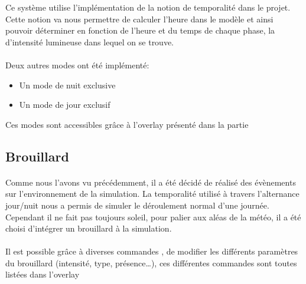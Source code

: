Ce système utilise l'implémentation de la notion de temporalité dans le projet.
Cette notion va nous permettre de calculer l'heure dans le modèle et ainsi
pouvoir déterminer en fonction de l'heure et du temps de chaque phase, la
d'intensité lumineuse dans lequel on se trouve.

\paragraph{}


\paragraph{}

Deux autres modes ont été implémenté:\\
\begin{itemize}
  \item Un mode de nuit exclusive
  \item Un mode de jour exclusif\\
\end{itemize}

Ces modes sont accessibles grâce à l'overlay présenté dans la partie %

\subsection{Brouillard}

\paragraph{}
Comme nous l'avons vu précédemment, il a été décidé de réalisé des évènements
sur l'environnement de la simulation. La temporalité utilisé à travers
l'alternance jour/nuit nous a permis de simuler le déroulement normal d'une
journée. Cependant il ne fait pas toujours soleil, pour palier aux aléas de la
météo, il a été choisi d'intégrer un brouillard à la simulation.

\paragraph{}
Il est possible grâce à diverses commandes , de modifier les différents
paramètres du brouillard (intensité, type, présence\ldots), ces différentes
commandes sont toutes listées dans l'overlay 


